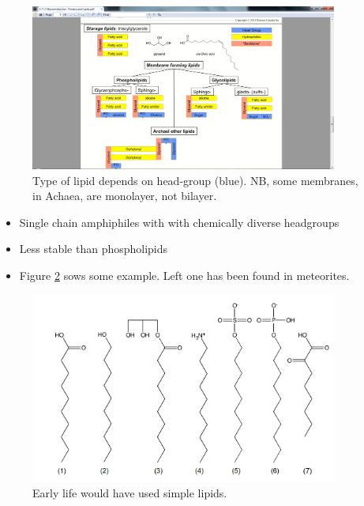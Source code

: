 \documentclass[]{article}
\begin{document}
\begin{figure}[H]
	\caption{Type of lipid depends on head-group (blue). NB, some membranes, in Achaea, are monolayer, not bilayer.}\label{fig:LipidTypes} 
	\includegraphics[width=0.9\textwidth]{LipidTypes}
\end{figure}

\begin{itemize}
	\item Single chain amphiphiles with with chemically
	diverse headgroups
	\item Less stable than phospholipids
	\item Figure \ref{fig:SimplerLipids} sows some example. Left one has been found in meteorites.
\end{itemize}
\begin{figure}[H]
	\caption{Early life would have used simple lipids.}\label{fig:SimplerLipids} 
	\includegraphics[width=0.9\textwidth]{SimplerLipids}
\end{figure}
\end{document}
